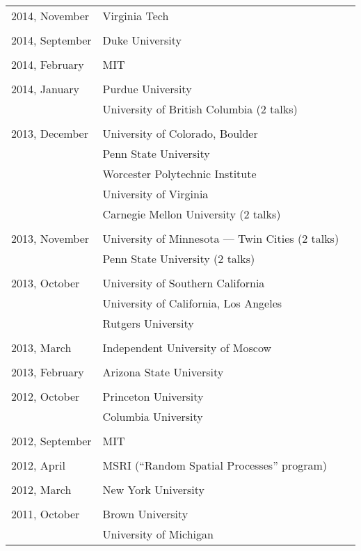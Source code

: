 \documentclass[letterpaper,11pt]{article}
\begin{document}
\begin{longtable}{llc}
  2014, November
  & Virginia Tech\\\\

  2014, September
  & Duke University\\\\

  2014, February
  & MIT\\\\

  2014, January 
  & Purdue University &\hspace{110pt}
  \\& University of British Columbia (2 talks)\\\\
  
  2013, December
  & University of Colorado, Boulder
  \\&Penn State University\\&Worcester Polytechnic Institute
  \\&University of Virginia\\&
  Carnegie Mellon University (2 talks)\\\\
  
  2013, November&
  University of Minnesota --- Twin Cities (2 talks)\\&
  Penn State University (2 talks)\\\\

  2013, October&
  University of Southern California 
  \\&
  University of California, Los Angeles
  \\&Rutgers University\\\\
  
  2013, March& Independent University of Moscow\\\\

  2013, February & Arizona State University\\\\

  2012, October & Princeton University \\
  & Columbia University\\\\

  2012, September & MIT \\\\ 

  2012, April & MSRI (``Random Spatial Processes'' program)\\\\

  2012, March & New York University\\\\

  2011, October & Brown University \\
  &University of Michigan
  \\
\end{longtable}
\bigskip
\end{document}

